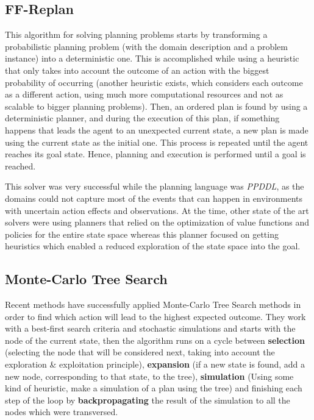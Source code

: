 \subsection{FF-Replan}
This algorithm \cite{Yoon2007} for solving planning problems starts by
transforming a probabilistic planning problem (with the domain description and a
problem instance) into a deterministic one. This is accomplished while using a
heuristic that only takes into account the outcome of an action with the biggest
probability of occurring (another heuristic exists, which considers each outcome
as a different action, using much more computational resources and not as
scalable to bigger planning problems). Then, an ordered plan is found by using a
deterministic planner, and during the execution of this plan, if something
happens that leads the agent to an unexpected current state, a new plan is made
using the current state as the initial one. This process is repeated until the
agent reaches its goal state. Hence, planning and execution is performed until a
goal is reached.

This solver was very successful while the planning language was \textit{PPDDL},
as the domains could not capture most of the events that can happen in
environments with uncertain action effects and observations. At the time, other
state of the art solvers were using planners that relied on the optimization of
value functions and policies for the entire state space whereas this planner
focused on getting heuristics which enabled a reduced exploration of the state
space into the goal.

\subsection{Monte-Carlo Tree Search}

Recent methods have successfully applied Monte-Carlo Tree Search methods in
order to find which action will lead to the highest expected outcome. They work
with a best-first search criteria and stochastic simulations and starts with the
node of the current state, then the algorithm runs on a cycle between
\textbf{selection} (selecting the node that will be considered next, taking into
account the exploration \& exploitation principle), \textbf{expansion} (if a new
state is found, add a new node, corresponding to that state, to the tree),
\textbf{simulation} (Using some kind of heuristic, make a simulation of a plan
using the tree) and finishing each step of the loop by \textbf{backpropagating}
the result of the simulation to all the nodes which were transversed.

